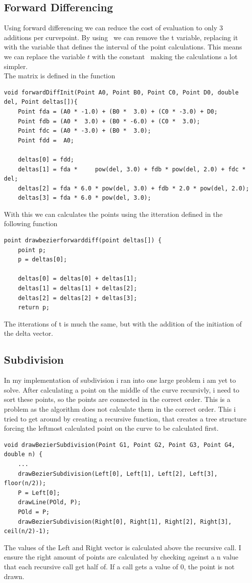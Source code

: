 \documentclass{article}
\begin{document}
\subsection{Forward Differencing}
Using forward differencing we can reduce the cost of evaluation to only 3 additions per curvepoint.
By using \delta\ we can remove the t variable, replacing it with the variable that defines the interval
of the point calculations. This means we can replace the variable $t$ with the constant \delta\ making the
calculations a lot simpler.\\
The matrix is defined in the function
\begin{verbatim}
void forwardDiffInit(Point A0, Point B0, Point C0, Point D0, double del, Point deltas[]){
    Point fda = (A0 * -1.0) + (B0 *  3.0) + (C0 * -3.0) + D0;
    Point fdb = (A0 *  3.0) + (B0 * -6.0) + (C0 *  3.0);
    Point fdc = (A0 * -3.0) + (B0 *  3.0);
    Point fdd =  A0;

    deltas[0] = fdd;
    deltas[1] = fda *     pow(del, 3.0) + fdb * pow(del, 2.0) + fdc * del;
    deltas[2] = fda * 6.0 * pow(del, 3.0) + fdb * 2.0 * pow(del, 2.0);
    deltas[3] = fda * 6.0 * pow(del, 3.0);
\end{verbatim}
With this we can calculates the points using the itteration defined in the following function 
\begin{verbatim}
point drawbezierforwarddiff(point deltas[]) {
    point p;
    p = deltas[0];

    deltas[0] = deltas[0] + deltas[1];
    deltas[1] = deltas[1] + deltas[2];
    deltas[2] = deltas[2] + deltas[3];
	return p;
\end{verbatim}
The itterations of t is much the same, but with the addition of the initiation of the delta vector.

\subsection{Subdivision}
In my implementation of subdivision i ran into one large problem i am yet to solve. After calculating a point
on the middle of the curve recursivly, i need to sort these points, so the points are connected in the correct order.
This is a problem as the algorithm does not calculate them in the correct order. This i tried to get around by creating
a recursive function, that creates a tree structure forcing the leftmost calculated point on the curve to be calculated
first.
\begin{verbatim}
void drawBezierSubdivision(Point G1, Point G2, Point G3, Point G4, double n) {
    ...
    drawBezierSubdivision(Left[0], Left[1], Left[2], Left[3], floor(n/2)); 
    P = Left[0];
    drawLine(POld, P);
    POld = P;
    drawBezierSubdivision(Right[0], Right[1], Right[2], Right[3], ceil(n/2)-1); 
\end{verbatim}
The values of the Left and Right vector is calculated above the recursive call. 
I ensure the right amount of points are calculated by checking ageinst a n value
that each recursive call get half of. If a call gets a value of 0, the point
is not drawn.
\end{document}
